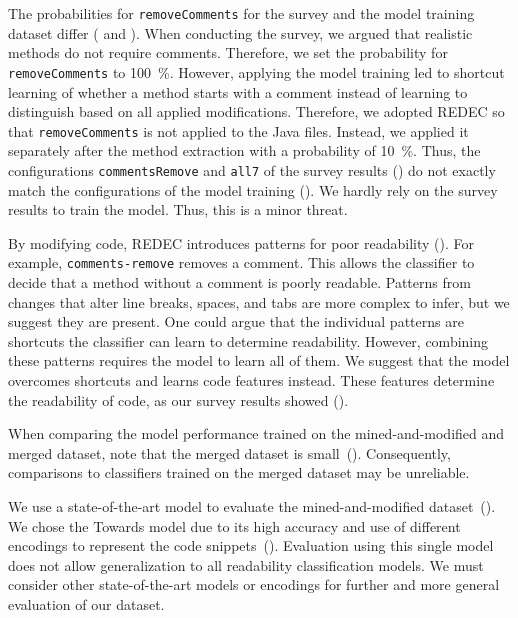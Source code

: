 \documentclass[%
class=scrreprt,
chapterprefix=false,%
open=right,%
twoside=true,%
paper=a4,%
logofile={Logo\_zentral\_farbig\_EN.png},%
thesistype=master,%
UKenglish,%
]{se2thesis}
\theoremstyle{definition}
\newcommand{\rdh}{REDEC\xspace}
\begin{document}
	The probabilities for \texttt{removeComments} for the survey and the model training dataset differ ( and ). When conducting the survey, we argued that realistic methods do not require comments. Therefore, we set the probability for \texttt{removeComments} to 100~\%. However, applying the model training led to shortcut learning of whether a method starts with a comment instead of learning to distinguish based on all applied modifications. Therefore, we adopted \rdh so that \texttt{removeComments} is not applied to the Java files. Instead, we applied it separately after the method extraction with a probability of 10~\%.
	Thus, the configurations \texttt{commentsRemove} and \texttt{all7} of the survey results () do not exactly match the configurations of the model training ().
	We hardly rely on the survey results to train the model. Thus, this is a minor threat.
	
	By modifying code, REDEC introduces patterns for poor readability (). For example, \texttt{comments-remove} removes a comment. This allows the classifier to decide that a method without a comment is poorly readable. Patterns from changes that alter line breaks, spaces, and tabs are more complex to infer, but we suggest they are present. One could argue that the individual patterns are shortcuts the classifier can learn to determine readability. However, combining these patterns requires the model to learn all of them. We suggest that the model overcomes shortcuts and learns code features instead. These features determine the readability of code, as our survey results showed ().
	
    When comparing the model performance trained on the mined-and-modified and merged dataset, note that the merged dataset is small~(). Consequently, comparisons to classifiers trained on the merged dataset may be unreliable.
	
	We use a state-of-the-art model to evaluate the mined-and-modified dataset~(). We chose the Towards model due to its high accuracy and use of different encodings to represent the code snippets~(). Evaluation using this single model does not allow generalization to all readability classification models. We must consider other state-of-the-art models or encodings for further and more general evaluation of our dataset.
		
\end{document}
